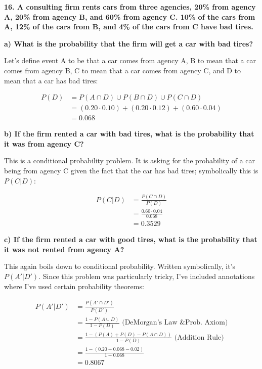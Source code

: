 \documentclass[12pt, letterpaper]{article}
\begin{document}
\pagebreak

\textbf{16. A consulting firm rents cars from three agencies, 20\% from agency A, 20\% from agency B, and 60\% from agency C.  10\% of the cars from A, 12\% of the cars from B, and 4\% of the cars from C have bad tires.}

\textbf{a) What is the probability that the firm will get a car with bad tires?}
\begin{center}
	Let's define event A to be that a car comes from agency A, B to mean that a car comes from agency B, C to mean that a car comes from agency C, and D to mean that a car has bad tires:
\end{center}
\begin{align*}
	P(D) &= P(A \cap D) \cup P(B \cap D) \cup P(C \cap D) \\
	&= (0.20 \cdot 0.10) + (0.20 \cdot 0.12) + (0.60 \cdot 0.04) \\
	&= \boxed{0.068}
\end{align*}

\textbf{b) If the firm rented a car with bad tires, what is the probability that it was from agency C?}
\begin{center}
	This is a conditional probability problem. It is asking for the probability of a car being from agency C given the fact that the car has bad tires; symbolically this is $P(C|D)$:
\end{center}
\begin{align*}
	P(C|D) &= \frac{P(C \cap D)}{P(D)} \\
	&= \frac{0.60 \cdot 0.04}{0.068} \\
	&= \boxed{0.3529}
\end{align*}

\pagebreak

\textbf{c) If the firm rented a car with good tires, what is the probability that it was not rented from agency A?}
\begin{center}
	This again boils down to conditional probability. Written symbolically, it's $P(A'|D')$. Since this problem was particularly tricky, I've included annotations where I've used certain probability theorems:
\end{center}
\begin{align*}
	P(A'|D') &= \frac{P(A' \cap D')}{P(D')} \\
	&= \frac{1-P(A \cup D)}{1-P(D)} \text{	(DeMorgan's Law \& Prob. Axiom)}\\
	&= \frac{1-(P(A)+P(D)-P(A \cap D))}{1-P(D)} \text{	(Addition Rule)}\\
	&= \frac{1-(0.20+0.068-0.02)}{1-0.068} \\
	&= \boxed{0.8067}
\end{align*}
\end{document}
